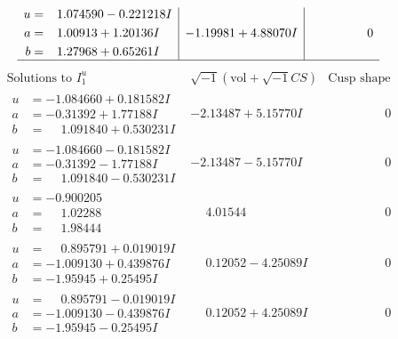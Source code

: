 \documentclass[1p]{elsarticle_modified}
\theoremstyle{definition}
\newcommand{\I}{\sqrt{-1}}
\begin{document}
$$\begin{array}{c|c|c}
\begin{aligned}
u &= \phantom{-}1.074590 - 0.221218 I \\
a &= \phantom{-}1.00913 + 1.20136 I \\
b &= \phantom{-}1.27968 + 0.65261 I\end{aligned}
 & -1.19981 + 4.88070 I & \phantom{-0.000000 } 0\\
 \hline 
 \end{array}$$\newpage$$\begin{array}{c|c|c}  
\text{Solutions to }I^u_{1}& \I (\text{vol} + \sqrt{-1}CS) & \text{Cusp shape}\\
 \hline 
\begin{aligned}
u &= -1.084660 + 0.181582 I \\
a &= -0.31392 + 1.77188 I \\
b &= \phantom{-}1.091840 + 0.530231 I\end{aligned}
 & -2.13487 + 5.15770 I & \phantom{-0.000000 } 0 \\ \hline\begin{aligned}
u &= -1.084660 - 0.181582 I \\
a &= -0.31392 - 1.77188 I \\
b &= \phantom{-}1.091840 - 0.530231 I\end{aligned}
 & -2.13487 - 5.15770 I & \phantom{-0.000000 } 0 \\ \hline\begin{aligned}
u &= -0.900205\phantom{ +0.000000I} \\
a &= \phantom{-}1.02288\phantom{ +0.000000I} \\
b &= \phantom{-}1.98444\phantom{ +0.000000I}\end{aligned}
 & \phantom{-}4.01544\phantom{ +0.000000I} & \phantom{-0.000000 } 0 \\ \hline\begin{aligned}
u &= \phantom{-}0.895791 + 0.019019 I \\
a &= -1.009130 + 0.439876 I \\
b &= -1.95945 + 0.25495 I\end{aligned}
 & \phantom{-}0.12052 - 4.25089 I & \phantom{-0.000000 } 0 \\ \hline\begin{aligned}
u &= \phantom{-}0.895791 - 0.019019 I \\
a &= -1.009130 - 0.439876 I \\
b &= -1.95945 - 0.25495 I\end{aligned}
 & \phantom{-}0.12052 + 4.25089 I & \phantom{-0.000000 } 0 \\ \hline\begin{aligned}

\end{aligned}
\end{array}$$
\end{document}
